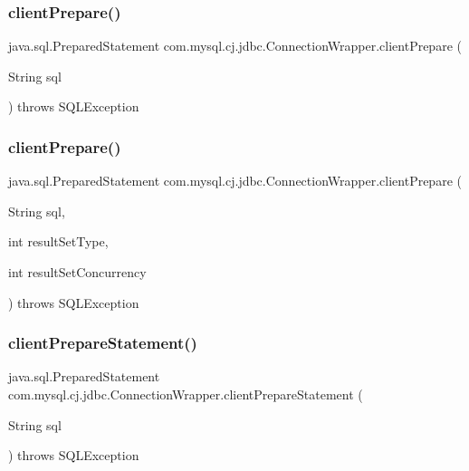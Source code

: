\subsubsection{\texorpdfstring{client\+Prepare()}{clientPrepare()}\hspace{0.1cm}{\footnotesize\ttfamily [1/2]}}
{\footnotesize\ttfamily java.\+sql.\+Prepared\+Statement com.\+mysql.\+cj.\+jdbc.\+Connection\+Wrapper.\+client\+Prepare (\begin{DoxyParamCaption}\item[{String}]{sql }\end{DoxyParamCaption}) throws S\+Q\+L\+Exception}

\mbox{\label{classcom_1_1mysql_1_1cj_1_1jdbc_1_1_connection_wrapper_a97c0bd9d37c2cf6bfd6c0cf9e30fb101}} 
\subsubsection{\texorpdfstring{client\+Prepare()}{clientPrepare()}\hspace{0.1cm}{\footnotesize\ttfamily [2/2]}}
{\footnotesize\ttfamily java.\+sql.\+Prepared\+Statement com.\+mysql.\+cj.\+jdbc.\+Connection\+Wrapper.\+client\+Prepare (\begin{DoxyParamCaption}\item[{String}]{sql,  }\item[{int}]{result\+Set\+Type,  }\item[{int}]{result\+Set\+Concurrency }\end{DoxyParamCaption}) throws S\+Q\+L\+Exception}

\mbox{\label{classcom_1_1mysql_1_1cj_1_1jdbc_1_1_connection_wrapper_abec439c58b0b01c1590be391a2d1969a}} 
\subsubsection{\texorpdfstring{client\+Prepare\+Statement()}{clientPrepareStatement()}\hspace{0.1cm}{\footnotesize\ttfamily [1/6]}}
{\footnotesize\ttfamily java.\+sql.\+Prepared\+Statement com.\+mysql.\+cj.\+jdbc.\+Connection\+Wrapper.\+client\+Prepare\+Statement (\begin{DoxyParamCaption}\item[{String}]{sql }\end{DoxyParamCaption}) throws S\+Q\+L\+Exception}

